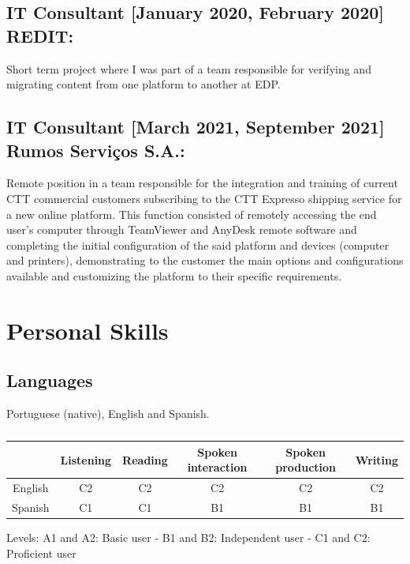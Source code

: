 \documentclass{article}
\begin{document}
\subsection{IT Consultant [January 2020, February 2020] REDIT:}

Short term project where I was part of a team responsible for verifying and migrating content from one platform to another at EDP.

\subsection{IT Consultant [March 2021, September 2021] Rumos Serviços S.A.:}

Remote position in a team responsible for the integration and training of current CTT commercial customers subscribing to the CTT Expresso shipping service for a new online platform. This function consisted of remotely accessing the end user's computer through TeamViewer and AnyDesk remote software and completing the initial configuration of the said platform and devices (computer and printers), demonstrating to the customer the main options and configurations available and customizing the platform to their specific requirements.

\section{Personal Skills}

\subsection{Languages}

Portuguese (native), English and Spanish.


\begin{table}[h!]
\begin{center}
\caption{}
\label{}
\begin{tabular}{c|c|c|c|c|c}
\textbf{} & \textbf{Listening} & \textbf{Reading} & \textbf{Spoken interaction} & \textbf{Spoken production} & \textbf{Writing} \\
\hline
English & C2 & C2 & C2 & C2 & C2\\
Spanish & C1 & C1 & B1 & B1 & B1\\
\end{tabular}
\end{center}
\end{table}
Levels: A1 and A2: Basic user - B1 and B2: Independent user - C1 and C2: Proficient user
\end{document}
